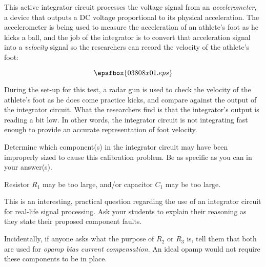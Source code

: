 

This active integrator circuit processes the voltage signal from an {\it accelerometer}, a device that outputs a DC voltage proportional to its physical acceleration.  The accelerometer is being used to measure the acceleration of an athlete's foot as he kicks a ball, and the job of the integrator is to convert that acceleration signal into a {\it velocity} signal so the researchers can record the velocity of the athlete's foot:

$$\epsfbox{03808x01.eps}$$

During the set-up for this test, a radar gun is used to check the velocity of the athlete's foot as he does come practice kicks, and compare against the output of the integrator circuit.  What the researchers find is that the integrator's output is reading a bit low.  In other words, the integrator circuit is not integrating fast enough to provide an accurate representation of foot velocity.

Determine which component(s) in the integrator circuit may have been improperly sized to cause this calibration problem.  Be as specific as you can in your answer(s).







Resistor $R_1$ may be too large, and/or capacitor $C_1$ may be too large.







This is an interesting, practical question regarding the use of an integrator circuit for real-life signal processing.  Ask your students to explain their reasoning as they state their proposed component faults.  

\vskip 10pt

Incidentally, if anyone asks what the purpose of $R_2$ or $R_3$ is, tell them that both are used for {\it opamp bias current compensation}.  An ideal opamp would not require these components to be in place.




